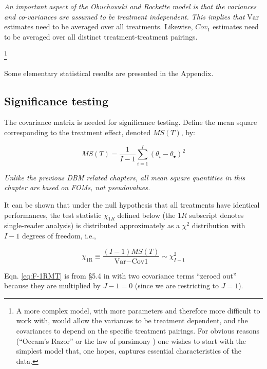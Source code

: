 \documentclass[
]{book}
\begin{document}
\emph{An important aspect of the Obuchowski and Rockette model is that the variances and co-variances are assumed to be treatment independent. This implies that} \(\text{Var}\) estimates need to be averaged over all treatments. Likewise, \(Cov_1\) estimates need to be averaged over all distinct treatment-treatment pairings.

\footnote{A more complex model, with more parameters and therefore more difficult to work with, would allow the variances to be treatment dependent, and the covariances to depend on the specific treatment pairings. For obvious reasons (``Occam's Razor'' or the law of parsimony ) one wishes to start with the simplest model that, one hopes, captures essential characteristics of the data.}

Some elementary statistical results are presented in the Appendix.

\hypertarget{st-or-multiple-treatment}{%
\subsection{Significance testing}\label{st-or-multiple-treatment}}

The covariance matrix is needed for significance testing. Define the mean square corresponding to the treatment effect, denoted \(MS(T)\), by:

\begin{equation}
MS(T)=\frac{1}{I-1}\sum_{i=1}^{I}(\theta_i-\theta_\bullet)^2
\label{eq:def-mst}
\end{equation}

\emph{Unlike the previous DBM related chapters, all mean square quantities in this chapter are based on FOMs, not pseudovalues.}

It can be shown that under the null hypothesis that all treatments have identical performances, the test statistic \(\chi_{1R}\) defined below (the \(1R\) subscript denotes single-reader analysis) is distributed approximately as a \(\chi^2\) distribution with \(I-1\) degrees of freedom, i.e.,

\begin{equation}
\chi_{\text{1R}} \equiv \frac{(I-1)MS(T)}{\text{Var}-\text{Cov1}} \sim \chi_{I-1}^{2}
\label{eq:F-1RMT}
\end{equation}

Eqn. \eqref{eq:F-1RMT} is from §5.4 in \citep{RN1865} with two covariance terms ``zeroed out'' because they are multiplied by \(J-1 = 0\) (since we are restricting to \(J=1\)).
\end{document}
